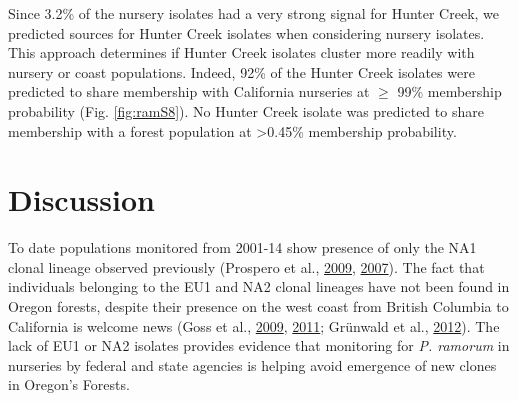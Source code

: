 \documentclass[double,12pt]{beavtex}
\begin{document}
  Since 3.2\% of the nursery isolates had a very strong signal for Hunter
  Creek, we predicted sources for Hunter Creek isolates when considering
  nursery isolates. This approach determines if Hunter Creek isolates
  cluster more readily with nursery or coast populations. Indeed, 92\% of
  the Hunter Creek isolates were predicted to share membership with
  California nurseries at \(\geq\) 99\% membership probability (Fig.
  \ref{fig:ramS8}). No Hunter Creek isolate was predicted to share
  membership with a forest population at \textgreater{}0.45\% membership
  probability.
  
  \section{Discussion}\label{discussion-1}
  
  To date populations monitored from 2001-14 show presence of only the NA1
  clonal lineage observed previously (Prospero et al.,
  \protect\hyperlink{ref-prospero2009migration}{2009},
  \protect\hyperlink{ref-prospero2007population}{2007}). The fact that
  individuals belonging to the EU1 and NA2 clonal lineages have not been
  found in Oregon forests, despite their presence on the west coast from
  British Columbia to California is welcome news (Goss et al.,
  \protect\hyperlink{ref-goss2009population}{2009},
  \protect\hyperlink{ref-goss2011phytophthora}{2011}; Grünwald et al.,
  \protect\hyperlink{ref-grunwald2012emergence}{2012}). The lack of EU1 or
  NA2 isolates provides evidence that monitoring for \emph{P. ramorum} in
  nurseries by federal and state agencies is helping avoid emergence of
  new clones in Oregon's Forests.
  
\end{document}
